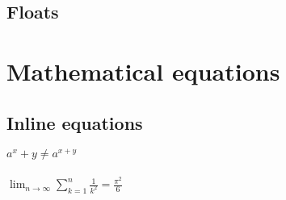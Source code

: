 \documentclass[12pt, oneside]{article}
\begin{document}
\subsection{Floats}









\newpage
\section{Mathematical equations}



\subsection{Inline equations}
$ a^x+y \neq a^{x+y}$ \\\\ %
\begin{math} \lim_{n \to \infty} \sum_{k=1}^n \frac{1}{k^2} = \frac{\pi^2}{6} \end{math} %
\end{document}
